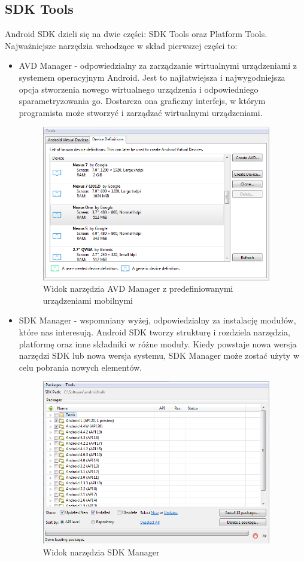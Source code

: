 \subsection{SDK Tools}

Android SDK dzieli się na dwie części: SDK Tools oraz Platform Tools. Najważniejsze narzędzia wchodzące w skład pierwszej części to:
\begin{itemize}
\item AVD Manager - odpowiedzialny za zarządzanie wirtualnymi urządzeniami z systemem operacyjnym Android. Jest to najłatwiejsza i najwygodniejsza opcja stworzenia nowego wirtualnego urządzenia i odpowiedniego sparametryzowania go. Dostarcza ona graficzny interfejs, w którym programista może stworzyć i zarządzać wirtualnymi urządzeniami.\cite{android:60}

\begin{figure}[H] 
\centering\includegraphics[width=10cm]{figures/avdmanager}
\caption{Widok narzędzia AVD Manager z predefiniowanymi urządzeniami mobilnymi}
\end{figure}

\item SDK Manager - wspomniany wyżej, odpowiedzialny za instalację modułów, które nas interesują. Android SDK tworzy strukturę i rozdziela narzędzia, platformę oraz inne składniki w różne moduły. Kiedy powstaje nowa wersja narzędzi SDK lub nowa wersja systemu, SDK Manager może zostać użyty w celu pobrania nowych elementów.\cite{android:59}

\begin{figure}[H] 
\centering\includegraphics[width=10cm]{figures/sdkmanager}
\caption{Widok narzędzia SDK Manager}
\end{figure}


\end{itemize}

